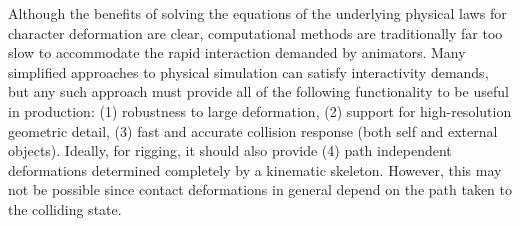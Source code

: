 

Although the benefits of solving the equations of the underlying
physical laws for character deformation are clear, computational
methods are traditionally far too slow to accommodate the rapid
interaction demanded by animators. Many simplified approaches to
physical simulation can satisfy interactivity demands, but any such
approach must provide all of the following functionality to be useful
in production: (1) robustness to large deformation, (2) support for high-resolution geometric detail, (3) fast and accurate collision response (both self and external objects). Ideally, for rigging, it should also provide (4) path independent deformations determined completely by a kinematic skeleton. However, this may not be possible since contact deformations in general depend on the path taken to the colliding state.


